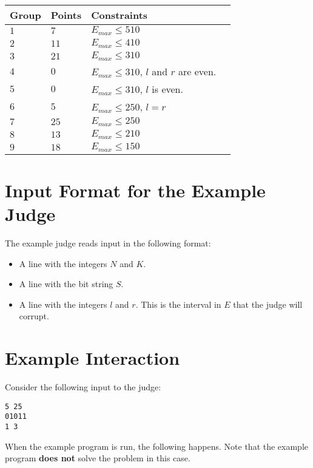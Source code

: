 \noindent
\begin{tabular}{| l | l | l | l |}
  \hline
  \textbf{Group} & \textbf{Points} & \textbf{Constraints} \\ \hline
  $1$   & $7$        & $E_{max} \leq 510$ \\ \hline
  $2$   & $11$       & $E_{max} \leq 410$ \\ \hline
  $3$   & $21$       & $E_{max} \leq 310$ \\ \hline
  $4$   & $0$        & $E_{max} \leq 310$, $l$ and $r$ are even. \\ \hline
  $5$   & $0$        & $E_{max} \leq 310$, $l$ is even. \\ \hline
  $6$   & $5$        & $E_{max} \leq 250$, $l=r$ \\ \hline
  $7$   & $25$       & $E_{max} \leq 250$ \\ \hline
  $8$   & $13$       & $E_{max} \leq 210$ \\ \hline
  $9$   & $18$       & $E_{max} \leq 150$ \\ \hline
\end{tabular}

\section*{Input Format for the Example Judge}
The example judge reads input in the following format:
\begin{itemize}
  \item A line with the integers $N$ and $K$.
  \item A line with the bit string $S$.
  \item A line with the integers $l$ and $r$. This is the interval in $E$ that the judge will corrupt.
\end{itemize}


\section*{Example Interaction}

Consider the following input to the judge:
\begin{verbatim}
5 25
01011
1 3
\end{verbatim}

When the example program is run, the following happens. Note that the example program \textbf{does not} solve the problem in this case.

